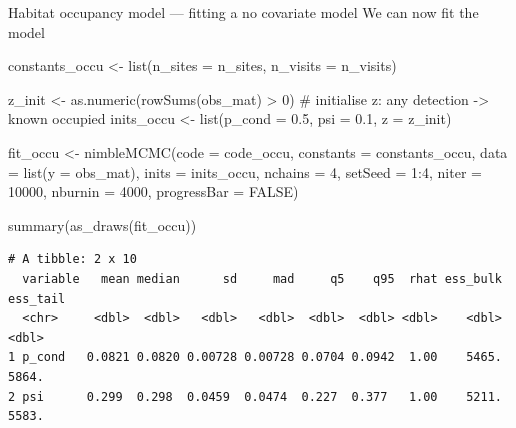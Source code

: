 \documentclass[
  10pt,
  ignorenonframetext,
  aspectratio=169,
  t]{beamer}
\newenvironment{Shaded}{\begin{snugshade}}{\end{snugshade}}
\newcommand{\AttributeTok}[1]{\textcolor[rgb]{0.40,0.45,0.13}{#1}}
\newcommand{\CommentTok}[1]{\textcolor[rgb]{0.37,0.37,0.37}{#1}}
\newcommand{\ConstantTok}[1]{\textcolor[rgb]{0.56,0.35,0.01}{#1}}
\newcommand{\DecValTok}[1]{\textcolor[rgb]{0.68,0.00,0.00}{#1}}
\newcommand{\FloatTok}[1]{\textcolor[rgb]{0.68,0.00,0.00}{#1}}
\newcommand{\FunctionTok}[1]{\textcolor[rgb]{0.28,0.35,0.67}{#1}}
\newcommand{\NormalTok}[1]{\textcolor[rgb]{0.00,0.23,0.31}{#1}}
\newcommand{\OtherTok}[1]{\textcolor[rgb]{0.00,0.23,0.31}{#1}}
\newcommand{\SpecialCharTok}[1]{\textcolor[rgb]{0.37,0.37,0.37}{#1}}
\begin{document}
\begin{frame}[fragile]{Habitat occupancy model --- fitting a no
covariate model}
\protect{}\label{habitat-occupancy-model-fitting-a-no-covariate-model-1}
We can now fit the model

\scriptsize

\begin{Shaded}
\begin{Highlighting}[]
\NormalTok{constants\_occu }\OtherTok{\textless{}{-}} \FunctionTok{list}\NormalTok{(}\AttributeTok{n\_sites =}\NormalTok{ n\_sites, }\AttributeTok{n\_visits =}\NormalTok{ n\_visits)}

\NormalTok{z\_init }\OtherTok{\textless{}{-}} \FunctionTok{as.numeric}\NormalTok{(}\FunctionTok{rowSums}\NormalTok{(obs\_mat) }\SpecialCharTok{\textgreater{}} \DecValTok{0}\NormalTok{) }\CommentTok{\# initialise z: any detection {-}\textgreater{} known occupied}
\NormalTok{inits\_occu }\OtherTok{\textless{}{-}} \FunctionTok{list}\NormalTok{(}\AttributeTok{p\_cond =} \FloatTok{0.5}\NormalTok{, }\AttributeTok{psi =} \FloatTok{0.1}\NormalTok{, }\AttributeTok{z =}\NormalTok{ z\_init)}

\NormalTok{fit\_occu }\OtherTok{\textless{}{-}} \FunctionTok{nimbleMCMC}\NormalTok{(}\AttributeTok{code =}\NormalTok{ code\_occu,}
                       \AttributeTok{constants =}\NormalTok{ constants\_occu,}
                       \AttributeTok{data =} \FunctionTok{list}\NormalTok{(}\AttributeTok{y =}\NormalTok{ obs\_mat),}
                       \AttributeTok{inits =}\NormalTok{ inits\_occu,}
                       \AttributeTok{nchains =} \DecValTok{4}\NormalTok{, }\AttributeTok{setSeed =} \DecValTok{1}\SpecialCharTok{:}\DecValTok{4}\NormalTok{,}
                       \AttributeTok{niter =} \DecValTok{10000}\NormalTok{, }\AttributeTok{nburnin =} \DecValTok{4000}\NormalTok{,}
                       \AttributeTok{progressBar =} \ConstantTok{FALSE}\NormalTok{)}

\FunctionTok{summary}\NormalTok{(}\FunctionTok{as\_draws}\NormalTok{(fit\_occu))}
\end{Highlighting}
\end{Shaded}

\begin{verbatim}
# A tibble: 2 x 10
  variable   mean median      sd     mad     q5    q95  rhat ess_bulk ess_tail
  <chr>     <dbl>  <dbl>   <dbl>   <dbl>  <dbl>  <dbl> <dbl>    <dbl>    <dbl>
1 p_cond   0.0821 0.0820 0.00728 0.00728 0.0704 0.0942  1.00    5465.    5864.
2 psi      0.299  0.298  0.0459  0.0474  0.227  0.377   1.00    5211.    5583.
\end{verbatim}

\normalsize
\end{frame}
\end{document}
